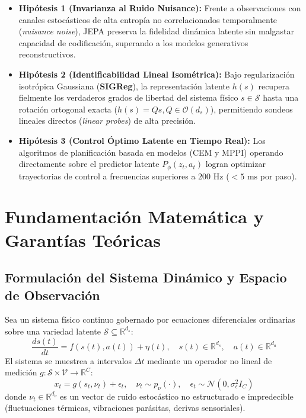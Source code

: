 \documentclass[10pt,a4paper]{article}
\begin{document}
\begin{itemize}[leftmargin=1.2em]
    \item \textbf{Hipótesis 1 (Invarianza al Ruido Nuisance):} Frente a observaciones con canales estocásticos de alta entropía no correlacionados temporalmente (\textit{nuisance noise}), JEPA preserva la fidelidad dinámica latente sin malgastar capacidad de codificación, superando a los modelos generativos reconstructivos.
    \item \textbf{Hipótesis 2 (Identificabilidad Lineal Isométrica):} Bajo regularización isotrópica Gaussiana (\textbf{SIGReg}), la representación latente $h(s)$ recupera fielmente los verdaderos grados de libertad del sistema físico $s \in \mathcal{S}$ hasta una rotación ortogonal exacta ($h(s) = Qs, Q \in \mathcal{O}(d_s)$), permitiendo sondeos lineales directos (\textit{linear probes}) de alta precisión.
    \item \textbf{Hipótesis 3 (Control Óptimo Latente en Tiempo Real):} Los algoritmos de planificación basada en modelos (CEM y MPPI) operando directamente sobre el predictor latente $P_\phi(z_t, a_t)$ logran optimizar trayectorias de control a frecuencias superiores a $200\text{ Hz}$ ($< 5\text{ ms}$ por paso).
\end{itemize}

\section{Fundamentación Matemática y Garantías Teóricas}

\subsection{Formulación del Sistema Dinámico y Espacio de Observación}
Sea un sistema físico continuo gobernado por ecuaciones diferenciales ordinarias sobre una variedad latente $\mathcal{S} \subseteq \mathbb{R}^{d_s}$:
\begin{equation}
    \frac{d s(t)}{dt} = f(s(t), a(t)) + \eta(t), \quad s(t) \in \mathbb{R}^{d_s}, \quad a(t) \in \mathbb{R}^{d_a}
\end{equation}
El sistema se muestrea a intervalos $\Delta t$ mediante un operador no lineal de medición $g: \mathcal{S} \times \mathcal{V} \to \mathbb{R}^C$:
\begin{equation}
    x_t = g(s_t, \nu_t) + \epsilon_t, \quad \nu_t \sim p_\nu(\cdot), \quad \epsilon_t \sim \mathcal{N}(0, \sigma_\epsilon^2 I_C)
\end{equation}
donde $\nu_t \in \mathbb{R}^{d_\nu}$ es un vector de ruido estocástico no estructurado e impredecible (fluctuaciones térmicas, vibraciones parásitas, derivas sensoriales).
\end{document}
